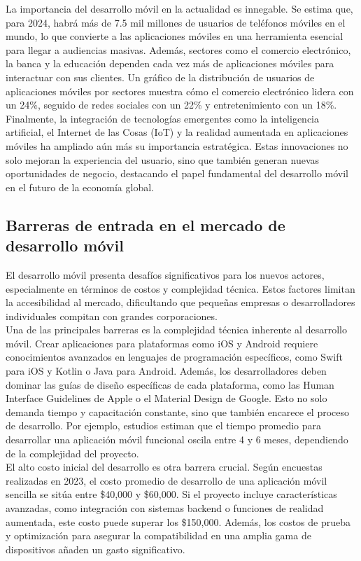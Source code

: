 La importancia del desarrollo móvil en la actualidad es innegable. Se estima que, para 2024,
habrá más de 7.5 mil millones de usuarios de teléfonos móviles en el mundo, lo que convierte
a las aplicaciones móviles en una herramienta esencial para llegar a audiencias masivas. Además,
sectores como el comercio electrónico, la banca y la educación dependen cada vez más de
aplicaciones móviles para interactuar con sus clientes. Un gráfico de la distribución de
usuarios de aplicaciones móviles por sectores muestra cómo el comercio electrónico lidera
con un 24\%, seguido de redes sociales con un 22\% y entretenimiento con un 18\%.\\

Finalmente, la integración de tecnologías emergentes como la inteligencia artificial, el
Internet de las Cosas (IoT) y la realidad aumentada en aplicaciones móviles ha ampliado
aún más su importancia estratégica. Estas innovaciones no solo mejoran la experiencia
del usuario, sino que también generan nuevas oportunidades de negocio, destacando el
papel fundamental del desarrollo móvil en el futuro de la economía global.


\subsection{Barreras de entrada en el mercado de desarrollo móvil}
El desarrollo móvil presenta desafíos significativos para los nuevos actores, especialmente
en términos de costos y complejidad técnica. Estos factores limitan la accesibilidad al mercado,
dificultando que pequeñas empresas o desarrolladores individuales compitan con grandes corporaciones.\\

Una de las principales barreras es la complejidad técnica inherente al desarrollo móvil. Crear
aplicaciones para plataformas como iOS y Android requiere conocimientos avanzados en lenguajes
de programación específicos, como Swift para iOS y Kotlin o Java para Android. Además, los
desarrolladores deben dominar las guías de diseño específicas de cada plataforma, como las Human
Interface Guidelines de Apple o el Material Design de Google. Esto no solo demanda tiempo y
capacitación constante, sino que también encarece el proceso de desarrollo. Por ejemplo, estudios
estiman que el tiempo promedio para desarrollar una aplicación móvil funcional oscila entre 4 y 6 meses,
dependiendo de la complejidad del proyecto.\\

El alto costo inicial del desarrollo es otra barrera crucial. Según encuestas realizadas en 2023,
el costo promedio de desarrollo de una aplicación móvil sencilla se sitúa entre \$40,000 y \$60,000.
Si el proyecto incluye características avanzadas, como integración con sistemas backend o funciones
de realidad aumentada, este costo puede superar los \$150,000. Además, los costos de prueba y
optimización para asegurar la compatibilidad en una amplia gama de dispositivos añaden un gasto significativo.\\

